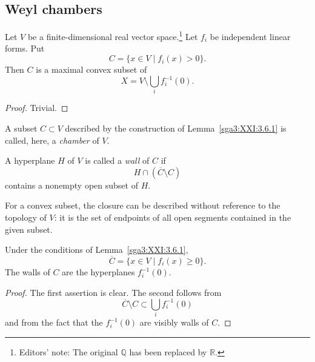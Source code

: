 \subsection{Weyl chambers}
\label{sga3:XXI:3.6}

\begin{lemma}\label{sga3:XXI:3.6.1}
Let \(V\) be a finite-dimensional real vector
space.\footnote{Editors' note: The original \(\mathbb{Q}\) has been
replaced by \(\mathbb{R}\).} Let \(f_i\) be independent linear forms.
Put
\[
 C=\{x\in V\mid f_i(x)>0\}.
\]
Then \(C\) is a maximal convex subset of
\[
 X=V\setminus\bigcup_i f_i^{-1}(0).
\]
\end{lemma}

\begin{proof}
Trivial.
\end{proof}


\begin{definition}\label{sga3:XXI:3.6.2}
A subset \(C\subset V\) described by the construction of
Lemma~\ref{sga3:XXI:3.6.1} is called, here, a \emph{chamber} of \(V\).
\end{definition}

\begin{definition}\label{sga3:XXI:3.6.3}
A hyperplane \(H\) of \(V\) is called a \emph{wall} of \(C\) if
\[
 H\cap(\overline C\setminus C)
\]
contains a nonempty open subset of \(H\).
\end{definition}

\begin{remark}\label{sga3:XXI:3.6.4}
For a convex subset, the closure can be described without reference
to the topology of \(V\): it is the set of endpoints of all open
segments contained in the given subset.
\end{remark}

\begin{lemma}\label{sga3:XXI:3.6.5}
Under the conditions of Lemma~\ref{sga3:XXI:3.6.1},
\[
 \overline C=\{x\in V\mid f_i(x)\ge0\}.
\]
The walls of \(C\) are the hyperplanes \(f_i^{-1}(0)\).
\end{lemma}

\begin{proof}
The first assertion is clear. The second follows from
\[
 \overline C\setminus C\subset\bigcup_i f_i^{-1}(0)
\]
and from the fact that the \(f_i^{-1}(0)\) are visibly walls of
\(C\).
\end{proof}

